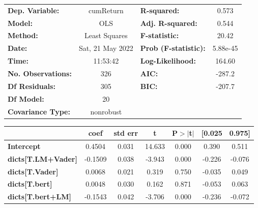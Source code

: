\begin{center}
\begin{tabular}{lclc}
\toprule
\textbf{Dep. Variable:}              &    cumReturn     & \textbf{  R-squared:         } &     0.573   \\
\textbf{Model:}                      &       OLS        & \textbf{  Adj. R-squared:    } &     0.544   \\
\textbf{Method:}                     &  Least Squares   & \textbf{  F-statistic:       } &     20.42   \\
\textbf{Date:}                       & Sat, 21 May 2022 & \textbf{  Prob (F-statistic):} &  5.88e-45   \\
\textbf{Time:}                       &     11:53:42     & \textbf{  Log-Likelihood:    } &    164.60   \\
\textbf{No. Observations:}           &         326      & \textbf{  AIC:               } &    -287.2   \\
\textbf{Df Residuals:}               &         305      & \textbf{  BIC:               } &    -207.7   \\
\textbf{Df Model:}                   &          20      & \textbf{                     } &             \\
\textbf{Covariance Type:}            &    nonrobust     & \textbf{                     } &             \\
\bottomrule
\end{tabular}
\begin{tabular}{lcccccc}
                                     & \textbf{coef} & \textbf{std err} & \textbf{t} & \textbf{P$> |$t$|$} & \textbf{[0.025} & \textbf{0.975]}  \\
\midrule
\textbf{Intercept}                   &       0.4504  &        0.031     &    14.633  &         0.000        &        0.390    &        0.511     \\
\textbf{dicts[T.LM+Vader]}           &      -0.1509  &        0.038     &    -3.943  &         0.000        &       -0.226    &       -0.076     \\
\textbf{dicts[T.Vader]}              &       0.0068  &        0.021     &     0.319  &         0.750        &       -0.035    &        0.049     \\
\textbf{dicts[T.bert]}               &       0.0048  &        0.030     &     0.162  &         0.871        &       -0.053    &        0.063     \\
\textbf{dicts[T.bert+LM]}            &      -0.1543  &        0.042     &    -3.706  &         0.000        &       -0.236    &       -0.072     \\

\end{tabular}
\end{center}
